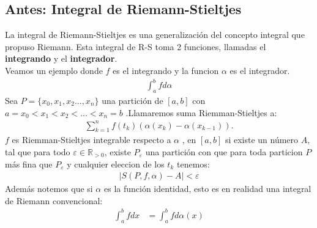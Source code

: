 \documentclass{article}
\begin{document}
	\subsection{Antes: Integral de Riemann-Stieltjes}
	\begin{flushleft}
		La integral de Riemann-Stieltjes es una generalización del concepto
		integral que propuso Riemann.
		Esta integral de R-S toma 2 funciones, llamadas el \textbf{integrando}
		y el \textbf{integrador}.\\
		Veamos un ejemplo donde $f$ es el integrando y la funcion $\alpha$ 
		es el integrador.
		\begin{equation}
			\begin{aligned}
				\int_{a}^{b}f d \alpha
			\end{aligned}
		\end{equation}
		Sea $P=\{x_0,x_1,x_2...,x_n\}$ una partición de $[a,b]$ con 
		$a=x_0<x_1<x_2<...<x_n=b$ .Llamaremos suma Riemman-Stieltjes a:
		\begin{equation}
			\begin{aligned}
				\sum_{k=1}^{n}f(t_k)( \alpha(x_{k}) -  \alpha(x_{k-1})).
			\end{aligned}
		\end{equation}
		$f$ es Riemman-Stieltjes integrable respecto a $\alpha$ ,  en $[a,b]$ si existe 
		un número $A$, tal que para todo $ \varepsilon \in \mathbb{R}_{>0}$, existe $ 
		 P_{\varepsilon}$ una partición con que para toda particion $P$ más fina que 
		 $P_{\varepsilon}$ y cualquier eleccion de los $t_{k}$ tenemos:
		 \begin{equation}
		 	\begin{aligned}
		 		|S(P,f,\alpha)-A| < \varepsilon
		 	\end{aligned}
		 \end{equation}
		 Además notemos que si $ \alpha $  es la función identidad, esto es en realidad una
		 integral de Riemann convencional:
		 \begin{equation}
		 	\begin{aligned}
				\int_{a}^{b}fdx &= \int_{a}^{b}fd \alpha(x)
			\end{aligned}
		 \end{equation}
	\end{flushleft}
\end{document}
